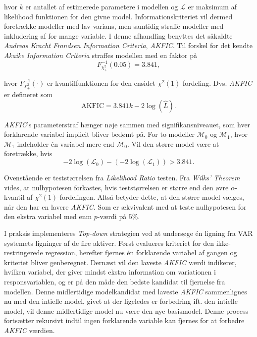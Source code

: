 \documentclass[
  a4paper,
  oneside]{memoir}
\begin{document}
hvor \(k\) er antallet af estimerede parametere i modellen og \(\mathcal{L}\) er maksimum af likelihood funktionen for den givne model. Informationskriteriet vil dermed foretrække modeller med lav varians, men samtidig straffe modeller med inkludering af for mange variable. I denne afhandling benyttes det såkaldte \emph{Andreas Kracht Frandsen Information Criteria}, \emph{AKFIC}. Til forskel for det kendte \emph{Akaike Information Criteria} straffes modellen med en faktor på
\[F^{-1}_{\chi_{+}^2}(0.05)=3.841,\]

hvor \(F^{-1}_{\chi_{+}^2}(\cdot)\) er kvantilfunktionen for den ensidet \(\chi^2(1)\)-fordeling. Dvs. \emph{AKFIC} er defineret som
\[\text{AKFIC}=3.841 k-2\log(\hat{L}).\]

\emph{AKFIC}'s parameterstraf hænger nøje sammen med signifikansniveauet, som hver forklarende variabel implicit bliver bedømt på. For to modeller \(\mathcal{M}_0\) og \(\mathcal{M}_1\), hvor \(\mathcal{M}_1\) indeholder én variabel mere end \(\mathcal{M}_0\). Vil den større model være at foretrække, hvis
\[-2\log(\mathcal{L}_0)-(-2\log(\mathcal{L}_1))>3.841.\]

Ovenstående er teststørrelsen fra \emph{Likelihood Ratio} testen. Fra \emph{Wilks' Theorem} vides, at nulhypotesen forkastes, hvis teststørrelsen er større end den øvre \(\alpha\)-kvantil af \(\chi^2(1)\)-fordelingen. Altså betyder dette, at den større model vælges, når den har en lavere \emph{AKFIC}. Som er ækvivalent med at teste nulhypotesen for den ekstra variabel med enm \(p\)-værdi på \(5\%\).

I praksis implementeres \emph{Top-down} strategien ved at undersøge én ligning fra VAR systemets ligninger af de fire aktiver. Først evalueres kriteriet for den ikke-restringerede regression, herefter fjernes én forklarende variabel af gangen og kriteriet bliver genberegnet. Dernæst vil den laveste \emph{AKFIC} værdi indikerer, hvilken variabel, der giver mindst ekstra information om variationen i responsvariablen, og er på den måde den bedste kandidat til fjernelse fra modellen. Denne midlertidige modelkandidat med laveste \emph{AKFIC} sammenlignes nu med den intielle model, givet at der ligeledes er forbedring ift. den intielle model, vil denne midlertidige model nu være den nye basismodel. Denne process fortsætter rekursivt indtil ingen forklarende variable kan fjernes for at forbedre \emph{AKFIC} værdien.
\end{document}
